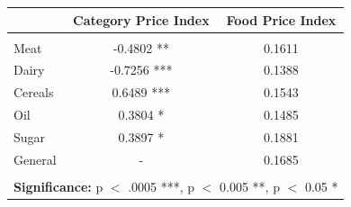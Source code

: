  
 \begin{center}
 \begin{tabular}{ l | c  | c  }
			
   & \textbf{Category Price Index}  & \textbf{Food Price Index} \\
  \hline
  \\
  Meat & -0.4802 **    & 0.1611  \\
  
  Dairy & -0.7256 ***  & 0.1388\\

  Cereals & 0.6489 *** & 0.1543 \\

  Oil & 0.3804 * &  0.1485  \\

  Sugar & 0.3897 * &0.1881 \\

  General & - & 0.1685 \\
\hline 

\multicolumn{3}{c}{\null}\\

\multicolumn{3}{c}{\textbf{Significance:} p $<$ .0005 ***, p $<$ 0.005 **, p $<$ 0.05 *}\\
\hline  
\end{tabular}
\end{center}


 
 
